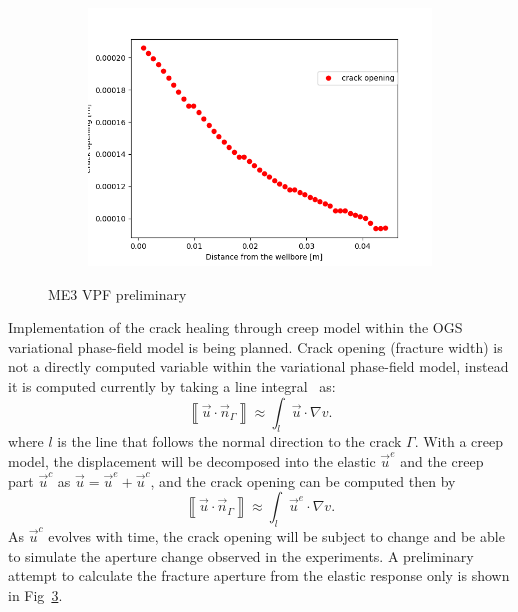 \begin{figure}[!ht]
\begin{subfigure}[c]{0.49\textwidth}
\label{fig:ME3_VPF_model}
\end{subfigure}
\hfill
\begin{subfigure}[c]{0.49\textwidth}
\includegraphics[width=1\textwidth]{figures/ME3_CrackWidth.png}
\label{fig:ME3_VPF_crack width}
\end{subfigure}
\label{fig:VPF_ME2_creep}
\caption{ME3 VPF preliminary}
\end{figure}

Implementation of the crack healing through creep model within the OGS variational phase-field model is being planned.
Crack opening (fracture width) is not a directly computed variable within the variational phase-field model, instead it is computed currently by taking a line integral~\cite{Yoshioka2020} as:
\begin{equation}
\left \llbracket \vec{u}\cdot \vec{n}_\Gamma \right\rrbracket
\approx \int_{l} \vec{u} \cdot \nabla v .
\label{eq:width_line_integral}
\end{equation}
where $l$ is the line that follows the normal direction to the crack $\Gamma$.
With a creep model, the displacement will be decomposed into the elastic $\vec{u}^e$ and the creep part $\vec{u}^c$ as $\vec{u} = \vec{u}^e+\vec{u}^c$, and the crack opening can be computed then by
\begin{equation}
\left \llbracket \vec{u}\cdot \vec{n}_\Gamma \right\rrbracket
\approx \int_{l} \vec{u}^e \cdot \nabla v .
\label{eq:width_line_integral}
\end{equation}
As $\vec{u}^c$ evolves with time, the crack opening will be subject to change and be able to simulate the aperture change observed in the experiments.
A preliminary attempt to calculate the fracture aperture from the elastic response only is shown in  Fig~\ref{fig:VPF_ME2_creep}.

